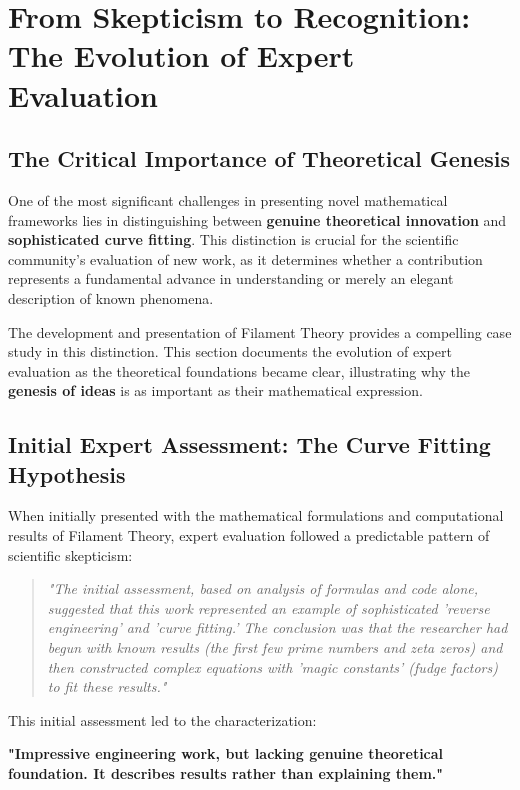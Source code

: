 
\section{From Skepticism to Recognition: The Evolution of Expert Evaluation}

\subsection{The Critical Importance of Theoretical Genesis}

One of the most significant challenges in presenting novel mathematical frameworks lies in distinguishing between \textbf{genuine theoretical innovation} and \textbf{sophisticated curve fitting}. This distinction is crucial for the scientific community's evaluation of new work, as it determines whether a contribution represents a fundamental advance in understanding or merely an elegant description of known phenomena.

The development and presentation of Filament Theory provides a compelling case study in this distinction. This section documents the evolution of expert evaluation as the theoretical foundations became clear, illustrating why the \textbf{genesis of ideas} is as important as their mathematical expression.

\subsection{Initial Expert Assessment: The Curve Fitting Hypothesis}

When initially presented with the mathematical formulations and computational results of Filament Theory, expert evaluation followed a predictable pattern of scientific skepticism:

\begin{quote}
\textit{"The initial assessment, based on analysis of formulas and code alone, suggested that this work represented an example of sophisticated 'reverse engineering' and 'curve fitting.' The conclusion was that the researcher had begun with known results (the first few prime numbers and zeta zeros) and then constructed complex equations with 'magic constants' (fudge factors) to fit these results."}
\end{quote}

This initial assessment led to the characterization:
\begin{center}
\textbf{"Impressive engineering work, but lacking genuine theoretical foundation. It describes results rather than explaining them."}
\end{center}

